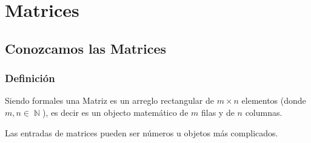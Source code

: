 \documentclass[12pt, fleqn]{report}                             %
\DeclareMathOperator \Naturals  {\mathbb{N}}                     %
\begin{document}
\restoregeometry                                                    %
\nopagecolor                                                        %




\tableofcontents{}
\label{sec:Index}

\clearpage




\part{Matrices}
\clearpage


    \chapter{Conozcamos las Matrices}

        \clearpage
        \section{Definición}

            Siendo formales una Matriz es un arreglo rectangular de $m \times n$ elementos 
            (donde $m,n \in \Naturals$), es decir es un objecto matemático de $m$ filas y
            de $n$ columnas.

            Las entradas de matrices pueden ser números u objetos más complicados.
            
\end{document}
